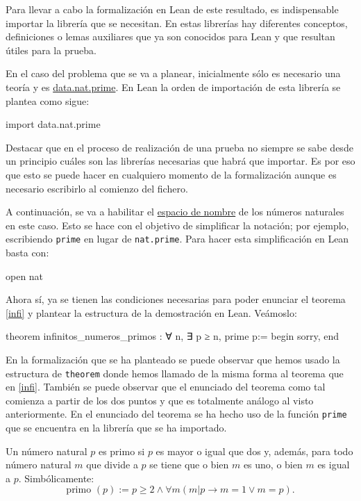Para llevar a cabo la formalización en Lean de este resultado, es
indispensable importar la librería que se necesitan. En estas
librerías hay diferentes conceptos, definiciones o lemas auxiliares que
ya son conocidos para Lean y que resultan útiles para la prueba.

En el caso del problema que se va a planear, inicialmente sólo es necesario
una teoría y es
\href{https://github.com/leanprover-community/mathlib/blob/master/src/data/nat/prime.lean}
{data.nat.prime}. En Lean la orden de importación de esta librería se plantea
como sigue:
\begin{leancode}
import data.nat.prime
\end{leancode}

\begin{nota}
  Destacar que en el proceso de realización de una prueba no siempre se sabe
  desde un principio cuáles son las librerías necesarias que habrá que importar.
  Es por eso que esto se puede hacer en cualquiero momento de la formalización
  aunque es necesario escribirlo al comienzo del fichero.
\end{nota}

A continuación, se va a habilitar el
\href{https://leanprover.github.io/reference/other_commands.html#namespaces}
{espacio de nombre} de los números naturales en este caso. Esto se hace
con el objetivo de simplificar la notación; por ejemplo, escribiendo
\texttt{prime} en lugar de \texttt{nat.prime}. Para hacer esta
simplificación en Lean basta con:
\begin{leancode}
open nat
\end{leancode}

Ahora sí, ya se tienen las condiciones necesarias para poder enunciar el
teorema \ref{infi} y plantear la estructura de la demostración en Lean.
Veámoslo:
\begin{leancode}
theorem infinitos_numeros_primos : ∀ n, ∃ p ≥ n, prime p:=
begin
  sorry,
end
\end{leancode}

En la formalización que se ha planteado se puede observar que hemos usado la
estructura de \texttt{theorem} donde hemos llamado de la misma forma al
teorema que en \ref{infi}. También se puede observar que el enunciado del
teorema como tal comienza a partir de los dos puntos y que es totalmente
análogo al visto anteriormente. En el enunciado del teorema se ha hecho uso
de la función \texttt{prime} que se encuentra en la librería que se ha
importado.

\begin{definicion}
  Un número natural \(p\) es primo si \(p\) es mayor o igual que dos y,
  además, para todo número natural \(m\) que divide a \(p\) se tiene
  que o bien \(m\) es uno, o bien \(m\) es igual a \(p\).
  Simbólicamente:
  \begin{equation*}
    \text{primo }(p) := p ≥ 2 ∧ ∀ m (m | p → m = 1 ∨ m = p).
  \end{equation*}
\end{definicion}

